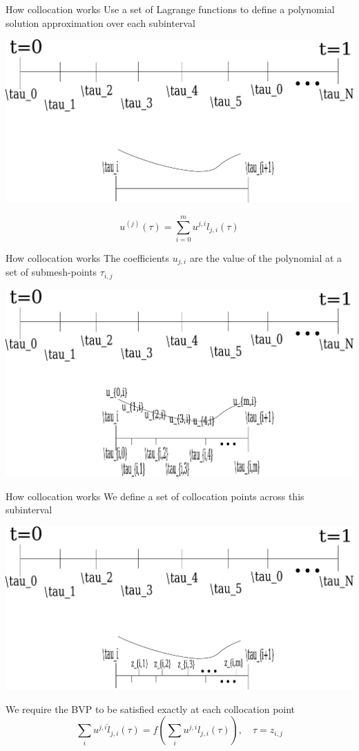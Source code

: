 \documentclass[presentation]{beamer}
\begin{document}
\begin{frame}[label={sec:org2f80dc3},plain]{How collocation works}
Use a set of Lagrange functions to define a polynomial solution approximation over each subinterval
\begin{center}
\includegraphics[width=.9\linewidth]{./5_basis.pdf}
\end{center}
\[u^{(j)}(\tau) = \sum_{i=0}^m u^{j,i} l_{j,i}(\tau)\]
\end{frame}

\begin{frame}[label={sec:orge49dd8e},plain]{How collocation works}
The coefficients \(u_{j,i}\) are the value of the polynomial at a set of submesh-points \(\tau_{i,j}\)
\begin{center}
\includegraphics[width=.9\linewidth]{./6_submesh.pdf}
\end{center}
\end{frame}

\begin{frame}[label={sec:org04be2ca},plain]{How collocation works}
We define a set of collocation points across this subinterval
\begin{center}
\includegraphics[width=.9\linewidth]{./7_coll.pdf}
\end{center}
We require the BVP to be satisfied exactly at each collocation point
\[\sum_i u^{j,i} \dot{l}_{j,i}(\tau) = f(\sum_i u^{j,i} l_{j,i}(\tau) ),\quad \tau = z_{i,j}\]
\end{frame}
\end{document}
